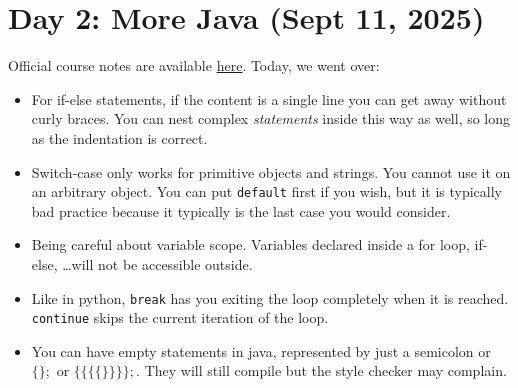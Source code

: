 \section{Day 2: More Java (Sept 11, 2025)}

Official course notes are available \href{https://github.com/CSC207-UofT/207-course-notes}{here}. Today, we went over:
\begin{itemize}
\item For if-else statements, if the content is a single line you can get away without curly braces. You can nest complex \textit{statements} inside this way as well, so long as the indentation is correct.
    \item Switch-case only works for primitive objects and strings. You cannot use it on an arbitrary object. You can put \texttt{default} first if you wish, but it is typically bad practice because it typically is the last case you would consider.
\item Being careful about variable scope. Variables declared inside a for loop, if-else, \dots will not be accessible outside.
\item Like in python, \texttt{break} has you exiting the loop completely when it is reached. \texttt{continue} skips the current iteration of the loop.
\item You can have empty statements in java, represented by just a semicolon or $\{\};$ or $\{ \{ \{ \{  \} \} \} \};$. They will still compile but the style checker may complain.
\end{itemize}
